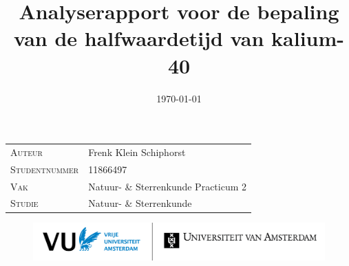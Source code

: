 \documentclass[11pt,a4paper]{article}
\title{Analyserapport voor de bepaling van de halfwaardetijd van kalium-40} %
\date{\today}
\begin{document}
\begin{titlepage}
\maketitle
\thispagestyle{empty} %

\vfill


 \begin{table}[h]
  \label{tab:credits}
  \begin{tabular}{l l}
   \textsc{Auteur} & Frenk Klein Schiphorst \\
   \textsc{Studentnummer}  & 11866497 \\ %
   \textsc{Vak} & Natuur- \& Sterrenkunde Practicum 2 \\
   \textsc{Studie} & Natuur- \& Sterrenkunde\\
  \end{tabular}
  \vspace{3ex}
 \end{table}

\begin{figure}
  \centering  
  \includegraphics[width=150mm]{logo-combi-vu-uva-nl}\\   %
  \vspace{-13ex}
 \end{figure}

\end{titlepage}

\setcounter{page}{2}    %
\end{document}
